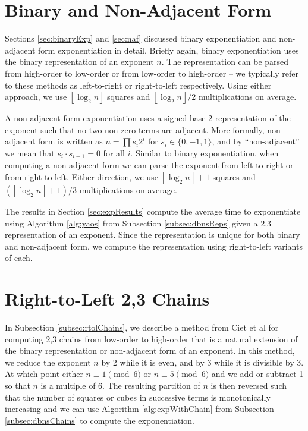 \documentclass{ucalgthes1}
\theoremstyle{definition}
\newcommand{\floor}[1]{\left\lfloor #1 \right\rfloor}
\begin{document}
\section{Binary and Non-Adjacent Form}

Sections \ref{sec:binaryExp} and \ref{sec:naf} discussed binary exponentiation and non-adjacent form exponentiation in detail.  Briefly again, binary exponentiation uses the binary representation of an exponent $n$.  The representation can be parsed from high-order to low-order or from low-order to high-order -- we typically refer to these methods as left-to-right or right-to-left respectively.  Using either approach, we use $\floor{\log_2n}$ squares and $\floor{\log_2n}/2$ multiplications on average.

A non-adjacent form exponentiation uses a signed base 2 representation of the exponent such that no two non-zero terms are adjacent.  More formally, non-adjacent form is written as $n=\prod s_i2^i$ for $s_i \in \{0, -1, 1\}$, and by ``non-adjacent'' we mean that $s_i \cdot s_{i+1} = 0$ for all $i$.  Similar to binary exponentiation, when computing a non-adjacent form we can parse the exponent from left-to-right or from right-to-left.  Either direction, we use $\floor{\log_2n} + 1$ squares and $(\floor{\log_2n}+1)/3$ multiplications on average.

The results in Section \ref{sec:expResults} compute the average time to exponentiate using Algorithm \ref{alg:yaos} from Subsection \ref{subsec:dbnsReps} given a 2,3 representation of an exponent.  Since the representation is unique for both binary and non-adjacent form, we compute the representation using right-to-left variants of each.


\section{Right-to-Left 2,3 Chains}
\label{sec:expR2LChains}

In Subsection \ref{subsec:rtolChains}, we describe a method from Ciet et al \cite[Figure 8]{Ciet2006} for computing 2,3 chains from low-order to high-order that is a natural extension of the binary representation or non-adjacent form of an exponent.  In this method, we reduce the exponent $n$ by 2 while it is even, and by 3 while it is divisible by 3.  At which point either $n \equiv 1 \pmod 6$ or $n \equiv 5 \pmod 6$ and we add or subtract 1 so that $n$ is a multiple of 6.  The resulting partition of $n$ is then reversed such that the number of squares or cubes in successive terms is monotonically increasing and we can use Algorithm \ref{alg:expWithChain} from Subsection \ref{subsec:dbnsChains} to compute the exponentiation.
\end{document}
